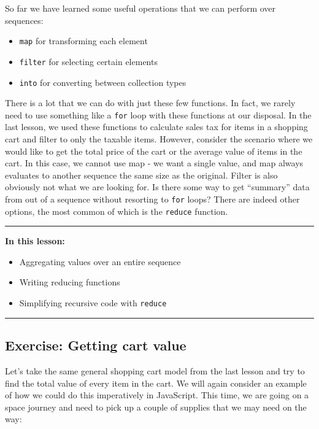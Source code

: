 \documentclass[10pt,twoside,openright]{memoir}
\begin{document}
So far we have learned some useful operations that we can perform over
sequences:

\begin{itemize}
\tightlist
\item
  \texttt{map} for transforming each element
\item
  \texttt{filter} for selecting certain elements
\item
  \texttt{into} for converting between collection types
\end{itemize}

There is a lot that we can do with just these few functions. In fact, we
rarely need to use something like a \texttt{for} loop with these
functions at our disposal. In the last lesson, we used these functions
to calculate sales tax for items in a shopping cart and filter to only
the taxable items. However, consider the scenario where we would like to
get the total price of the cart or the average value of items in the
cart. In this case, we cannot use map - we want a single value, and map
always evaluates to another sequence the same size as the original.
Filter is also obviously not what we are looking for. Is there some way
to get ``summary'' data from out of a sequence without resorting to
\texttt{for} loops? There are indeed other options, the most common of
which is the \texttt{reduce} function.

\begin{center}\rule{0.5\linewidth}{0.5pt}\end{center}

\textbf{In this lesson:}

\begin{itemize}
\tightlist
\item
  Aggregating values over an entire sequence
\item
  Writing reducing functions
\item
  Simplifying recursive code with \texttt{reduce}
\end{itemize}

\begin{center}\rule{0.5\linewidth}{0.5pt}\end{center}


\subsection{Exercise: Getting cart value}

Let's take the same general shopping cart model from the last lesson and
try to find the total value of every item in the cart. We will again
consider an example of how we could do this imperatively in JavaScript.
This time, we are going on a space journey and need to pick up a couple
of supplies that we may need on the way:
\end{document}
